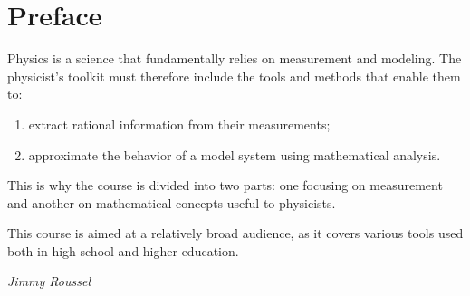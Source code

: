 \chapter*{Preface}
Physics is a science that fundamentally relies on measurement and modeling. The physicist's toolkit must therefore include the tools and methods that enable them to:
\begin{enumerate}
    \item extract rational information from their measurements;
    \item approximate the behavior of a model system using mathematical analysis.
\end{enumerate}
This is why the course is divided into two parts: one focusing on measurement and another on mathematical concepts useful to physicists.

This course is aimed at a relatively broad audience, as it covers various tools used both in high school and higher education.


\begin{flushright}
	\textit{Jimmy Roussel}
\end{flushright}
